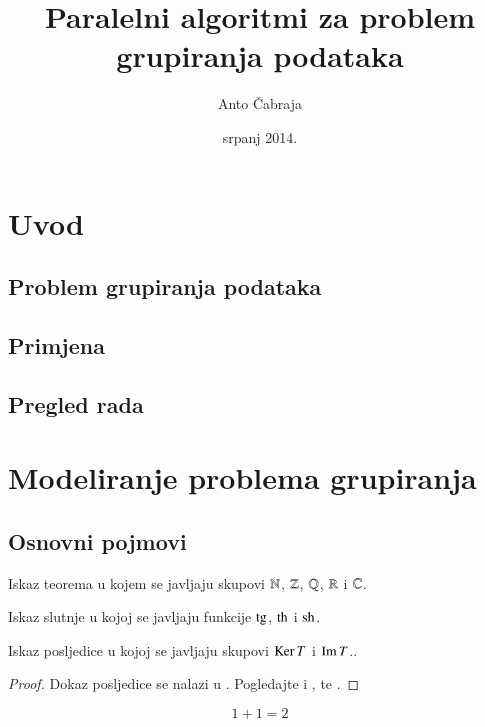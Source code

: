 \documentclass[a4paper,twoside,12pt]{memoir} %
\title{Paralelni algoritmi za problem grupiranja podataka}
\author{Anto Čabraja}
\date{srpanj 2014.}  %
\begin{document}
\frontmatter


\chapter*{Uvod}
\section[Problem grupiranja podataka][PGP]{Problem grupiranja podataka}
\section[Primjena][primjena]{Primjena}
\section[Pregled rada][pregled]{Pregled rada}

\chapter[Modeliranje problema grupiranja][modeliranje]{Modeliranje problema grupiranja}	

\section[Osnovni pojmovi][os-pojmovi]{Osnovni pojmovi}

\begin{thm}
Iskaz teorema u kojem se javljaju skupovi  $\mathbb{N}$, $\mathbb{Z}$, $\mathbb{Q}$, $\mathbb{R}$ i $\mathbb{C}$.
\end{thm}
\begin{conj}
Iskaz slutnje u kojoj se javljaju funkcije $\operatorname{tg}$, $\operatorname{th}$ i $\operatorname{sh}$.
\end{conj}
\begin{cor}
Iskaz posljedice u kojoj se javljaju skupovi $\operatorname{Ker} T$ i $\operatorname{Im} T$..
\end{cor}
\begin{proof}
Dokaz posljedice se nalazi u \cite{kljuc}. Pogledajte i \cite{kurepa1956convex}, \cite{kurepa1981funkcionalna} te \cite{Dutkay:2009}.
\end{proof}
\begin{equation}
\label{eq:jed1}
	1+1=2
\end{equation}
\end{document}
